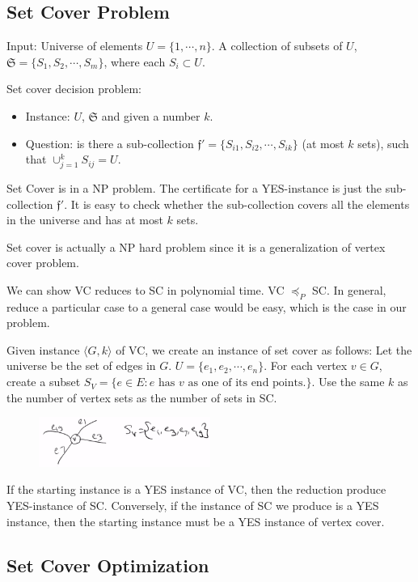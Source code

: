 \subsection{Set Cover Problem}
Input: Universe of elements $U = \{1, \cdots, n\}$. A collection of subsets of $U$, $\mathfrak{S} = \{S_1, S_2, \cdots, S_m\}$, where each $S_i \subset U$. 

Set cover decision problem: 
\begin{itemize}
	\item Instance: $U$, $\mathfrak{S}$ and given a number $k$.
	\item Question: is there a sub-collection $\mathfrak{f}' = \{S_{i1}, S_{i2}, \cdots, S_{ik}\}$ (at most $k$ sets), such that $\cup_{j=1}^k S_{ij} = U$.
\end{itemize}

Set Cover is in a NP problem. The certificate for a YES-instance is just the sub-collection $\mathfrak{f}'$. It is easy to check whether the sub-collection covers all the elements in the universe and has at most $k$ sets.

Set cover is actually a NP hard problem since it is a generalization of vertex cover problem.


We can show VC reduces to SC in polynomial time. VC $\preccurlyeq_P$ SC. In general, reduce a particular case to a general case would be easy, which is the case in our problem.

Given instance $\langle G, k \rangle$ of VC, we create an instance of set cover as follows:
Let the universe be the set of edges in $G$. $U = \{e_1, e_2, \cdots, e_n\}$. For each vertex $v \in G$, create a subset $S_V = \{e \in E: e \text{ has $v$ as one of its end points.}\}$. Use the same $k$ as the number of vertex sets as the number of sets in SC.
\begin{figure}[H]
	\centering
	\includegraphics[width=0.5\textwidth]{fig/vs-reduce-to-sc.png}
\end{figure}

If the starting instance is a YES instance of VC, then the reduction produce YES-instance of SC. Conversely, if the instance of SC we produce is a YES instance, then the starting instance must be a YES instance of vertex cover.

\subsection{Set Cover Optimization}

